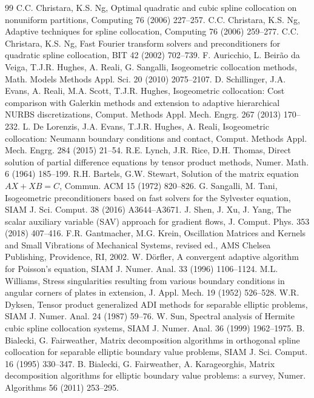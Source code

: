 \documentclass[preprint,12pt]{elsarticle}
\theoremstyle{remark}
\begin{document}
\begin{thebibliography}{99}
 C.C. Christara, K.S. Ng, Optimal quadratic and cubic spline collocation on nonuniform partitions, Computing 76 (2006) 227--257.
 C.C. Christara, K.S. Ng, Adaptive techniques for spline collocation, Computing 76 (2006) 259--277.
 C.C. Christara, K.S. Ng, Fast Fourier transform solvers and preconditioners for quadratic spline collocation, BIT 42 (2002) 702--739.
 F. Auricchio, L. Beir\~ao da Veiga, T.J.R. Hughes, A. Reali, G. Sangalli, Isogeometric collocation methods, Math. Models Methods Appl. Sci. 20 (2010) 2075--2107.
 D. Schillinger, J.A. Evans, A. Reali, M.A. Scott, T.J.R. Hughes, Isogeometric collocation: Cost comparison with Galerkin methods and extension to adaptive hierarchical NURBS discretizations, Comput. Methods Appl. Mech. Engrg. 267 (2013) 170--232.
 L. De Lorenzis, J.A. Evans, T.J.R. Hughes, A. Reali, Isogeometric collocation: Neumann boundary conditions and contact, Comput. Methods Appl. Mech. Engrg. 284 (2015) 21--54.
 R.E. Lynch, J.R. Rice, D.H. Thomas, Direct solution of partial difference equations by tensor product methods, Numer. Math. 6 (1964) 185--199.
 R.H. Bartels, G.W. Stewart, Solution of the matrix equation $AX+XB=C$, Commun. ACM 15 (1972) 820--826.
 G. Sangalli, M. Tani, Isogeometric preconditioners based on fast solvers for the Sylvester equation, SIAM J. Sci. Comput. 38 (2016) A3644--A3671.
 J. Shen, J. Xu, J. Yang, The scalar auxiliary variable (SAV) approach for gradient flows, J. Comput. Phys. 353 (2018) 407--416.
 F.R. Gantmacher, M.G. Krein, Oscillation Matrices and Kernels and Small Vibrations of Mechanical Systems, revised ed., AMS Chelsea Publishing, Providence, RI, 2002.
 W. D\"orfler, A convergent adaptive algorithm for Poisson's equation, SIAM J. Numer. Anal. 33 (1996) 1106--1124.
 M.L. Williams, Stress singularities resulting from various boundary conditions in angular corners of plates in extension, J. Appl. Mech. 19 (1952) 526--528.
 W.R. Dyksen, Tensor product generalized ADI methods for separable elliptic problems, SIAM J. Numer. Anal. 24 (1987) 59--76.
 W. Sun, Spectral analysis of Hermite cubic spline collocation systems, SIAM J. Numer. Anal. 36 (1999) 1962--1975.
 B. Bialecki, G. Fairweather, Matrix decomposition algorithms in orthogonal spline collocation for separable elliptic boundary value problems, SIAM J. Sci. Comput. 16 (1995) 330--347.
 B. Bialecki, G. Fairweather, A. Karageorghis, Matrix decomposition algorithms for elliptic boundary value problems: a survey, Numer. Algorithms 56 (2011) 253--295.
\end{thebibliography}
\end{document}
